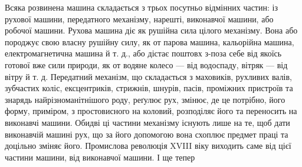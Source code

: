 Всяка розвинена машина складається з трьох посутньо відмінних
частин: із рухової машини, передатного механізму, нарешті,
виконавчої машини, або робочої машини. Рухова машина
діє як рушійна сила цілого механізму. Вона або породжує свою
власну рушійну силу, як от парова машина, кальорійна машина,
електромагнетична машина й т. д., або дістає поштовх з-поза
себе від якоїсь готової вже сили природи, як от водяне колесо — від
водоспаду, вітряк — від вітру й т. д. Передатний механізм,
що складається з маховиків, рухливих валів, зубчастих коліс,
ексцентриків, стрижнів, шнурів, пасів, проміжних пристроїв
та знарядь найрізноманітнішого роду, реґулює рух, змінює, де
це потрібно, його форму, приміром, з простовисного на коловий,
розподіляє його та переносить на виконавчі машини. Обидві ці
частини механізму існують лише на те, щоб дати виконавчій машині
рух, що за його допомогою вона схоплює предмет праці та
доцільно зміняє його. Промислова революція XVIII віку виходить
саме від цієї частини машини, від виконавчої машини. І ще тепер
\parbreak{}  %
